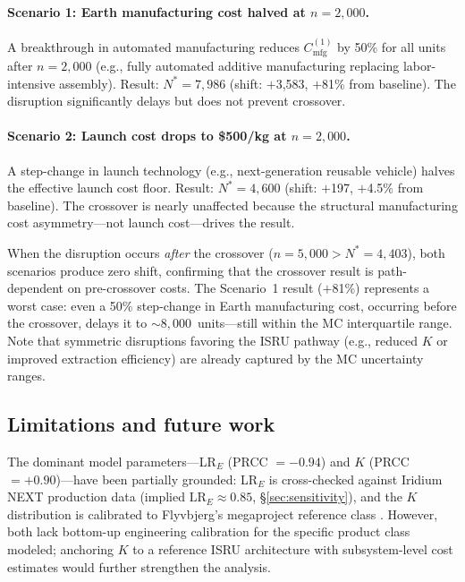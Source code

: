\documentclass[preprint,12pt]{elsarticle}
\begin{document}
\paragraph{Scenario 1: Earth manufacturing cost halved at $n = 2{,}000$.} A breakthrough in automated manufacturing reduces $C_{\mathrm{mfg}}^{(1)}$ by 50\% for all units after $n = 2{,}000$ (e.g., fully automated additive manufacturing replacing labor-intensive assembly). Result: $N^* = 7{,}986$ (shift: $+$3{,}583, $+$81\% from baseline). The disruption significantly delays but does not prevent crossover.

\paragraph{Scenario 2: Launch cost drops to \$500/kg at $n = 2{,}000$.} A step-change in launch technology (e.g., next-generation reusable vehicle) halves the effective launch cost floor. Result: $N^* = 4{,}600$ (shift: $+$197, $+$4.5\% from baseline). The crossover is nearly unaffected because the structural manufacturing cost asymmetry---not launch cost---drives the result.

When the disruption occurs \emph{after} the crossover ($n = 5{,}000 > N^* = 4{,}403$), both scenarios produce zero shift, confirming that the crossover result is path-dependent on pre-crossover costs. The Scenario~1 result ($+$81\%) represents a worst case: even a 50\% step-change in Earth manufacturing cost, occurring before the crossover, delays it to ${\sim}8{,}000$~units---still within the MC interquartile range. Note that symmetric disruptions favoring the ISRU pathway (e.g., reduced $K$ or improved extraction efficiency) are already captured by the MC uncertainty ranges.

\subsection{Limitations and future work}

The dominant model parameters---LR$_E$ (PRCC $= -0.94$) and $K$ (PRCC $= +0.90$)---have been partially grounded: LR$_E$ is cross-checked against Iridium NEXT production data (implied $\mathrm{LR}_E \approx 0.85$, \S\ref{sec:sensitivity}), and the $K$ distribution is calibrated to Flyvbjerg's megaproject reference class \cite{flyvbjerg2014}. However, both lack bottom-up engineering calibration for the specific product class modeled; anchoring $K$ to a reference ISRU architecture with subsystem-level cost estimates would further strengthen the analysis.
\end{document}
